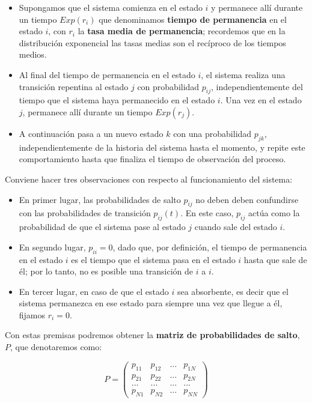 \documentclass[
]{book}
\providecommand{\tightlist}{%
  \setlength{\itemsep}{0pt}\setlength{\parskip}{0pt}}
\theoremstyle{definition}
\theoremstyle{definition}
\theoremstyle{definition}
\theoremstyle{definition}
\theoremstyle{remark}
\begin{document}
\begin{itemize}
\item
  Supongamos que el sistema comienza en el estado \(i\) y permanece allí durante un tiempo \(Exp(r_i)\) que denominamos \textbf{tiempo de permanencia} en el estado \(i\), con \(r_i\) la \textbf{tasa media de permanencia}; recordemos que en la distribución exponencial las tasas medias son el recíproco de los tiempos medios.
\item
  Al final del tiempo de permanencia en el estado \(i\), el sistema realiza una transición repentina al estado \(j\) con probabilidad \(p_{ij}\), independientemente del tiempo que el sistema haya permanecido en el estado \(i\). Una vez en el estado \(j\), permanece allí durante un tiempo \(Exp(r_j)\).
\item
  A continuación pasa a un nuevo estado \(k\) con una probabilidad \(p_{jk}\), independientemente de la historia del sistema hasta el momento, y repite este comportamiento hasta que finaliza el tiempo de observación del proceso.
\end{itemize}

Conviene hacer tres observaciones con respecto al funcionamiento del sistema:

\begin{itemize}
\tightlist
\item
  En primer lugar, las probabilidades de salto \(p_{ij}\) no deben deben confundirse con las probabilidades de transición \(p_{ij}(t)\). En este caso, \(p_{ij}\) actúa como la probabilidad de que el sistema pase al estado \(j\) cuando sale del estado \(i\).
\item
  En segundo lugar, \(p_{ii} = 0\), dado que, por definición, el tiempo de permanencia en el estado \(i\) es el tiempo que el sistema pasa en el estado \(i\) hasta que sale de él; por lo tanto, no es posible una transición de \(i\) a \(i\).
\item
  En tercer lugar, en caso de que el estado \(i\) sea absorbente, es decir que el sistema permanezca en ese estado para siempre una vez que llegue a él, fijamos \(r_i = 0\).
\end{itemize}

Con estas premisas podremos obtener la \textbf{matriz de probabilidades de salto}, \(P\), que denotaremos como:

\[P = 
\begin{pmatrix}
p_{11} & p_{12} & ... & p_{1N}\\
p_{21} & p_{22} & ... & p_{2N}\\
... & ... & ... & ...\\
p_{N1} & p_{N2} & ... & p_{NN}
\end{pmatrix}\]
\end{document}
